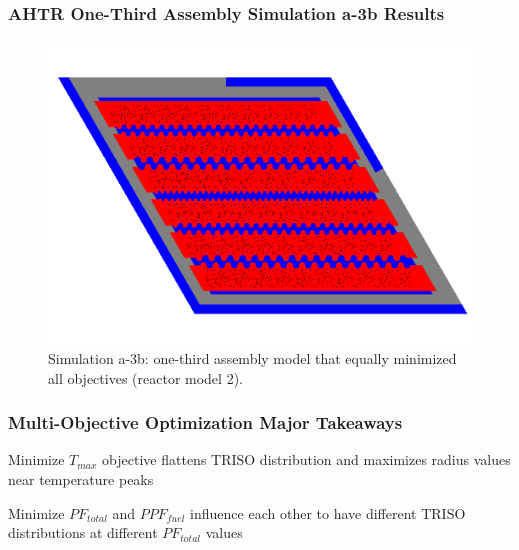 \begin{frame}
    \frametitle{AHTR One-Third Assembly Simulation a-3b Results}
    \begin{figure}
        \includegraphics[width=0.75\linewidth]{../docs/figures/assem-obj-3-all-min-all.png} 
        \caption{Simulation a-3b: one-third assembly model that equally minimized all 
        objectives (reactor model 2).}
    \end{figure}
\end{frame}

\begin{frame}
    \frametitle{Multi-Objective Optimization Major Takeaways}
    Minimize $T_{max}$ objective flattens TRISO distribution and maximizes radius 
        values near temperature peaks 

    Minimize $PF_{total}$ and $PPF_{fuel}$ influence each other to have different 
    TRISO distributions at different $PF_{total}$ values 
\end{frame}

